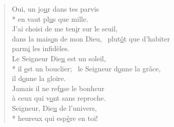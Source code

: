 \begin{verse}
Oui, un jo\underline{u}r dans tes parvis \\*
en vaut pl\underline{u}s que mille. \\

J’ai choisi de me ten\underline{i}r sur le seuil, \\
dans la mais\underline{o}n de mon Dieu,~\psalmstar
plut\underline{ô}t que d’habiter \\
parm\underline{i} les infidèles. \\

Le Seigneur Die\underline{u} est un soleil, \\*
il \underline{e}st un bouclier;~\psalmstar
le Seigneur d\underline{o}nne la grâce, \\
il d\underline{o}nne la gloire. \\

Jamais il ne ref\underline{u}se le bonheur \\
à ceux qui v\underline{o}nt sans reproche. \\

Seigneur, Die\underline{u} de l’univers, \\*
heureux qui esp\underline{è}re en toi! \\
\end{verse}


